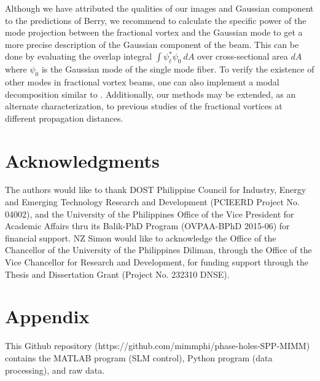 \documentclass[10pt,a4paper,twoside]{article}
\renewcommand{\l}{\ell}
\begin{document}
Although we have attributed the qualities of our images and Gaussian component to the predictions of Berry, we recommend to calculate the specific power of the mode projection between the fractional vortex and the Gaussian mode to get a more precise description of the Gaussian component of the beam. This can be done by evaluating the overlap integral $\int \psi_{\l}^* \psi_{0}~dA$ over cross-sectional area $dA$ where $\psi_0$ is the Gaussian mode of the single mode fiber. To verify the existence of other modes in fractional vortex beams, one can also implement a modal decomposition similar to \cite{vasnetsov2005analysis}. Additionally, our methods may be extended, as an alternate characterization, to previous studies \cite{fiber-struc} of the fractional vortices at different propagation distances.




\section*{Acknowledgments}
The authors would like to thank DOST Philippine Council for Industry, Energy and Emerging Technology Research and Development (PCIEERD Project No. 04002), and the 
University of the Philippines Office of the Vice President for Academic Affairs thru its Balik-PhD Program (OVPAA-BPhD 2015-06) for financial support. NZ Simon would like to acknowledge the Office of the Chancellor of the University of the Philippines Diliman, through the Office of the Vice Chancellor for Research and Development, for funding support through the Thesis and Dissertation Grant (Project No. 232310 DNSE).





\section*{Appendix}

This Github repository (https://github.com/mimmphi/phase-holes-SPP-MIMM) contains the MATLAB program (SLM control), Python program (data processing), and raw data.
\end{document}
